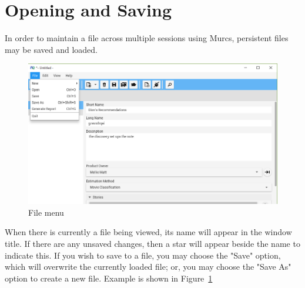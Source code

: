 \section{Opening and Saving}

In order to maintain a file across multiple sessions using Murcs, persistent files may be saved and loaded.

\begin{figure}[h]
	\centering
	\includegraphics[width=\textwidth]{images/screenshots/file_menu.PNG}
	\caption{File menu}
	\label{fig:file_menu}
\end{figure}

When there is currently a file being viewed, its name will appear in the window title. If there are any unsaved changes, then a star will appear beside the name to indicate this. If you wish to save to a file, you may choose the "Save" option, which will overwrite the currently loaded file; or, you may choose the "Save As" option to create a new file. Example is shown in Figure~\ref{fig:file_menu}